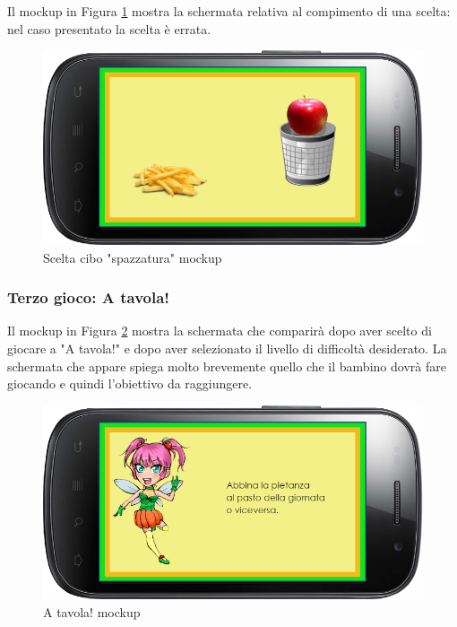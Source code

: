 Il mockup in Figura \ref{fig:Scelta "E' sano o no?"} mostra la schermata relativa al compimento di una scelta: nel caso presentato la scelta è errata.
\vspace{70pt}
\begin{figure}[htbp]
\centering
\includegraphics[width=\textwidth]{Images/Mockup/sanoscelta}
\caption{Scelta cibo "spazzatura" mockup}
\label{fig:Scelta "E' sano o no?"}
\end{figure}
\clearpage


\subsubsection{Terzo gioco: A tavola!}
Il mockup in Figura \ref{fig:A tavola!} mostra la schermata che comparirà dopo aver scelto di giocare a "A tavola!" e dopo aver selezionato il livello di difficoltà desiderato. La schermata che appare spiega molto brevemente quello che il bambino dovrà fare giocando e quindi l'obiettivo da raggiungere.
\vspace{70pt}
\begin{figure}[htbp]
\centering
\includegraphics[width=\textwidth]{Images/Mockup/gioco3}
\caption{A tavola! mockup}
\label{fig:A tavola!}
\end{figure}
\clearpage

